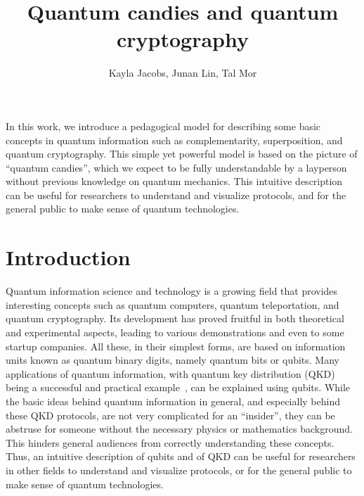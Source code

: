 \documentclass{article}
\begin{document}
\title{Quantum candies and quantum cryptography}
\author{Kayla Jacobs, Junan Lin, Tal Mor}
\date{}

\maketitle


In this work, we introduce a pedagogical model for describing some basic concepts in quantum information such as complementarity, superposition, and quantum cryptography.
This simple yet powerful model is based on the picture of ``quantum candies'', which we expect to be fully understandable by a layperson without previous knowledge on quantum mechanics.
This intuitive description can be useful for researchers to understand and visualize protocols, and for the general public to make sense of quantum technologies.


\section{Introduction}

Quantum information science and technology is a growing field that provides interesting concepts such as quantum computers, quantum teleportation, and quantum cryptography.
Its development has proved fruitful in both theoretical and experimental aspects, leading to various demonstrations and even to some startup companies. 
All these, in their simplest forms, are based on information units known as quantum binary digits, namely quantum bits or qubits.
Many applications of quantum information, with quantum key distribution (QKD) being a successful and practical example~\cite{bennett1984quantum,grosshans2003quantum,schmitt2007experimental}, can be explained using qubits.
While the basic ideas behind quantum information in general, and especially behind these QKD protocols, are not very complicated for an ``insider'', they can be abstruse for someone without the necessary physics or mathematics background.
This hinders general audiences from correctly understanding these concepts.
Thus, an intuitive description of qubits and of QKD can be useful for researchers in other fields to understand and visualize protocols, or for the general public to make sense of quantum technologies. 
\end{document}
